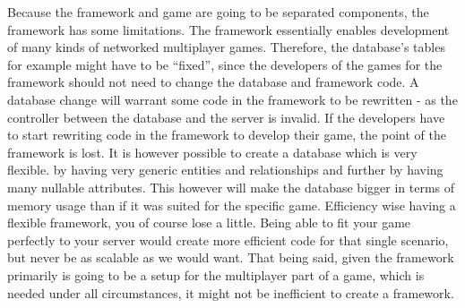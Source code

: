 Because the framework and game are going to be separated components, the framework has some limitations. The framework essentially enables development of many kinds of networked multiplayer games. Therefore, the database's tables for example might have to be ``fixed'', since the developers of the games for the framework should not need to change the database and framework code. A database change will warrant some code in the framework to be rewritten - as the controller between the database and the server is invalid. If the developers have to start rewriting code in the framework to develop their game, the point of the framework is lost. It is however possible to create a database which is very flexible. by having very generic entities and relationships and further by having many nullable attributes. This however will make the database bigger in terms of memory usage than if it was suited for the specific game.
Efficiency wise having a flexible framework, you of course lose a little. Being able to fit your game perfectly to your server would create more efficient code for that single scenario, but never be as scalable as we would want. That being said, given the framework primarily is going to be a setup for the multiplayer part of a game, which is needed under all circumstances, it might not be inefficient to create a framework.